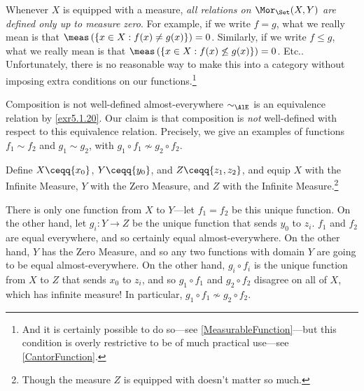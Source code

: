 \begin{displayquote}
Whenever $X$ is equipped with a measure, \emph{all relations on $\Mor _{\Set}(X,Y)$ are defined only up to measure zero}.  For example, if we write $f=g$, what we really mean is that $\meas \left( \{ x\in X:f(x)\neq g(x)\} \right) =0$.  Similarly, if we write $f\leq g$, what we really mean is that $\meas \left( \{ x\in X:f(x)\not \leq g(x)\} \right) =0$.  Etc..  Unfortunately, there is no reasonable way to make this into a category without imposing extra conditions on our functions.\footnote{And it is certainly possible to do so---see \cref{MeasurableFunction}---but this condition is overly restrictive to be of much practical use---see \cref{CantorFunction}.}
\end{displayquote}
\begin{exm}{Composition is not well-defined almost-everywhere}{}
$\sim _{\AlE}$ is an equivalence relation by \cref{exr5.1.20}.  Our claim is that composition is \emph{not} well-defined with respect to this equivalence relation.  Precisely, we give an examples of functions $f_1\sim f_2$ and $g_1\sim g_2$, with $g_1\circ f_1\not \sim g_2\circ f_2$.

Define $X\ceqq \{ x_0\}$, $Y\ceqq \{ y_0\}$, and $Z\ceqq \{ z_1,z_2\}$, and equip $X$ with the Infinite Measure, $Y$ with the Zero Measure, and $Z$ with the Infinite Measure.\footnote{Though the measure $Z$ is equipped with doesn't matter so much.}

There is only one function from $X$ to $Y$---let $f_1=f_2$ be this unique function.  On the other hand, let $g_i\colon Y\rightarrow Z$ be the unique function that sends $y_0$ to $z_i$.  $f_1$ and $f_2$ are equal everywhere, and so certainly equal almost-everywhere.  On the other hand, $Y$ has the Zero Measure, and so any two functions with domain $Y$ are going to be equal almost-everywhere.  On the other hand, $g_i\circ f_i$ is the unique function from $X$ to $Z$ that sends $x_0$ to $z_i$, and so $g_1\circ f_1$ and $g_2\circ f_2$ disagree on all of $X$, which has infinite measure!  In particular, $g_1\circ f_1\not \sim g_2\circ f_2$.
\end{exm}

